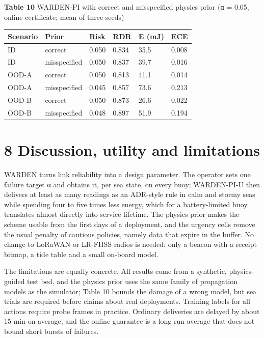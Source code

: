 \documentclass[
  11pt,
]{article}
\begin{document}

\textbf{Table 10} WARDEN-PI with correct and misspecified physics prior
(α = 0.05, online certificate; mean of three seeds)

\begin{longtable}[]{@{}llllll@{}}
\toprule\noalign{}
Scenario & Prior & Risk & RDR & E (mJ) & ECE \\
\midrule\noalign{}
\endhead
\bottomrule\noalign{}
\endlastfoot
ID & correct & 0.050 & 0.834 & 35.5 & 0.008 \\
ID & misspecified & 0.050 & 0.837 & 39.7 & 0.016 \\
OOD-A & correct & 0.050 & 0.813 & 41.1 & 0.014 \\
OOD-A & misspecified & 0.045 & 0.857 & 73.6 & 0.213 \\
OOD-B & correct & 0.050 & 0.873 & 26.6 & 0.022 \\
OOD-B & misspecified & 0.048 & 0.897 & 51.9 & 0.194 \\
\end{longtable}

\hypertarget{discussion-utility-and-limitations}{%
\section{8 Discussion, utility and
limitations}\label{discussion-utility-and-limitations}}

WARDEN turns link reliability into a design parameter. The operator sets
one failure target α and obtains it, per sea state, on every buoy;
WARDEN-PI-U then delivers at least as many readings as an ADR-style rule
in calm and stormy seas while spending four to five times less energy,
which for a battery-limited buoy translates almost directly into service
lifetime. The physics prior makes the scheme usable from the first days
of a deployment, and the urgency cells remove the usual penalty of
cautious policies, namely data that expire in the buffer. No change to
LoRaWAN or LR-FHSS radios is needed: only a beacon with a receipt
bitmap, a tide table and a small on-board model.

The limitations are equally concrete. All results come from a synthetic,
physics-guided test bed, and the physics prior uses the same family of
propagation models as the simulator; Table 10 bounds the damage of a
wrong model, but sea trials are required before claims about real
deployments. Training labels for all actions require probe frames in
practice. Ordinary deliveries are delayed by about 15 min on average,
and the online guarantee is a long-run average that does not bound short
bursts of failures.
\end{document}

